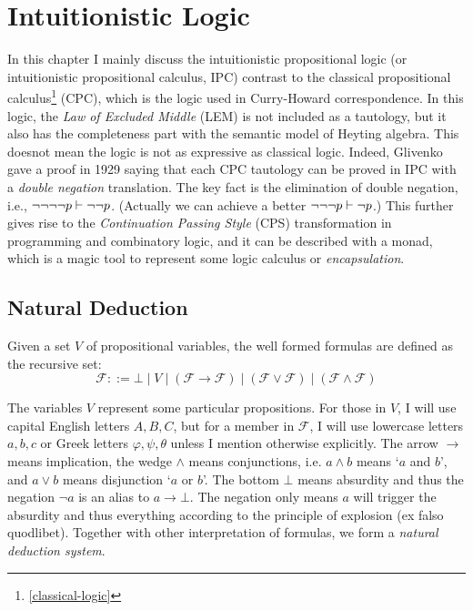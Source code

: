 \chapter{Intuitionistic Logic}
\label{intuitionistic-logic}

In this chapter I mainly discuss the intuitionistic propositional logic
(or intuitionistic propositional calculus, IPC) contrast to the
classical propositional calculus\footnote{\autoref{classical-logic}} 
(CPC), which is the logic used
in Curry-Howard correspondence. In this logic, the {\it Law of Excluded
Middle} (LEM) is not included as a tautology, but it also has the 
completeness part with the semantic model of Heyting algebra. 
This doesnot mean the logic is not as expressive as classical logic.
Indeed, Glivenko gave a proof in 1929 \cite{glivenko1929quelques} saying
that each CPC tautology can be proved in IPC with a {\it double negation}
translation. The key fact is the elimination of double negation, i.e.,
$\neg\neg\neg\neg p\vdash \neg\neg p$. (Actually we can achieve a better
$\neg\neg\neg p\vdash\neg p$.) This further gives rise to the {\it
Continuation Passing Style} (CPS) transformation in programming and 
combinatory logic, and it can be described with a monad, which is a
magic tool to represent some logic calculus or {\it encapsulation}.

\section{Natural Deduction}
\newcommand{\formula}{\mathscr{F}}

Given a set $V$ of propositional variables, the well formed
formulas are defined as the recursive set:
$$
    \formula ::= \bot 
        \mid V 
        \mid (\formula \to \formula) 
        \mid (\formula \vee \formula)
        \mid (\formula \wedge \formula)
$$

The variables $V$ represent some particular propositions. For those in
$V$, I will use capital English letters $A,B,C$, but for a member in 
$\formula$, I will use lowercase letters $a,b,c$ or Greek letters 
$\varphi,\psi,\theta$ unless I mention otherwise explicitly. 
The arrow $\to$ means implication, the wedge $\wedge$
means conjunctions, i.e. $a\wedge b$ means `$a$ and $b$', and
$a\vee b$ means disjunction `$a$ or $b$'. The bottom $\bot$ means 
absurdity and thus the negation $\neg a$ is an alias to $a\to\bot$.
The negation only means $a$ will trigger the absurdity and thus everything
according to the principle of explosion (ex falso quodlibet). Together
with other interpretation of formulas, we form a {\it natural deduction
system}. 

